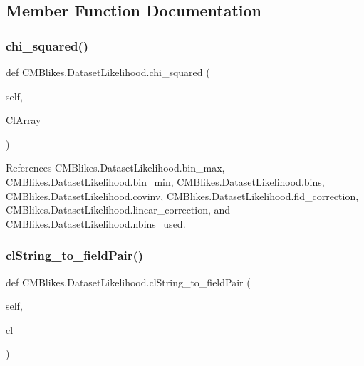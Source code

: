 \subsection{Member Function Documentation}
\mbox{\label{classCMBlikes_1_1DatasetLikelihood_a344ec47a2697348cbfa42a047e426baa}} 
\subsubsection{\texorpdfstring{chi\+\_\+squared()}{chi\_squared()}}
{\footnotesize\ttfamily def C\+M\+Blikes.\+Dataset\+Likelihood.\+chi\+\_\+squared (\begin{DoxyParamCaption}\item[{}]{self,  }\item[{}]{Cl\+Array }\end{DoxyParamCaption})}



References C\+M\+Blikes.\+Dataset\+Likelihood.\+bin\+\_\+max, C\+M\+Blikes.\+Dataset\+Likelihood.\+bin\+\_\+min, C\+M\+Blikes.\+Dataset\+Likelihood.\+bins, C\+M\+Blikes.\+Dataset\+Likelihood.\+covinv, C\+M\+Blikes.\+Dataset\+Likelihood.\+fid\+\_\+correction, C\+M\+Blikes.\+Dataset\+Likelihood.\+linear\+\_\+correction, and C\+M\+Blikes.\+Dataset\+Likelihood.\+nbins\+\_\+used.

\mbox{\label{classCMBlikes_1_1DatasetLikelihood_a1c4319df1f3bee812339356d08d11266}} 
\subsubsection{\texorpdfstring{cl\+String\+\_\+to\+\_\+field\+Pair()}{clString\_to\_fieldPair()}}
{\footnotesize\ttfamily def C\+M\+Blikes.\+Dataset\+Likelihood.\+cl\+String\+\_\+to\+\_\+field\+Pair (\begin{DoxyParamCaption}\item[{}]{self,  }\item[{}]{cl }\end{DoxyParamCaption})}



